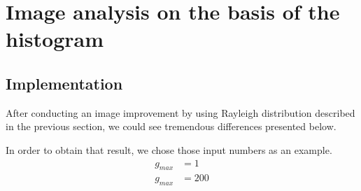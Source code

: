 \documentclass[12pt]{article}
\begin{document}
\section{Image analysis on the basis of the histogram}
\subsection{Implementation}

After conducting an image improvement by using Rayleigh distribution described in the previous section, we could see tremendous differences presented below.

In order to obtain that result, we chose those input numbers as an example.
\begin{align*}
    g_{max} & = 1   \\[1ex]
    g_{max} & = 200
\end{align*}
\end{document}

